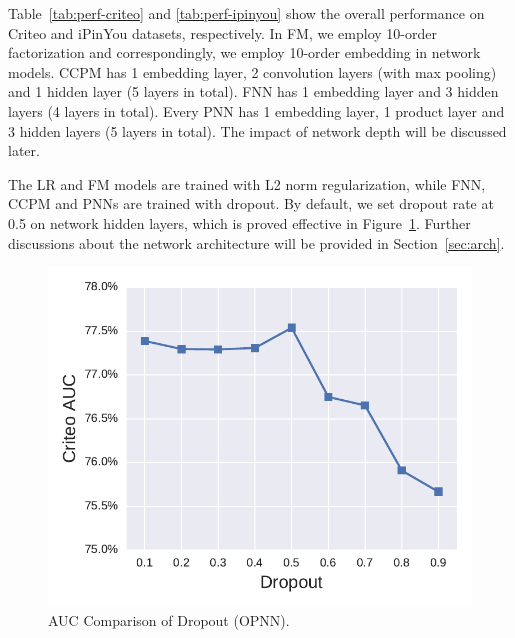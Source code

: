 \documentclass[conference]{IEEEtran}
\newcommand{\kan}[1]{{\bf \color{green} [[Kan says ``#1'']]}}
\begin{document}
Table~\ref{tab:perf-criteo} and \ref{tab:perf-ipinyou} show the overall performance on Criteo and iPinYou datasets, respectively.
In FM, we employ 10-order factorization and correspondingly, we employ 10-order embedding in network models. CCPM has 1 embedding layer, 2 convolution layers (with max pooling) and 1 hidden layer (5 layers in total). FNN has 1 embedding layer and 3 hidden layers (4 layers in total).
Every PNN has 1 embedding layer, 1 product layer and 3 hidden layers (5 layers in total). The impact of network depth will be discussed later.

The LR and FM models are trained with L2 norm regularization, while FNN, CCPM and PNNs are trained with dropout.
By default, we set dropout rate at 0.5 on network hidden layers, which is proved effective in Figure~\ref{fig:drop-auc}.
Further discussions about the network architecture will be provided in Section~\ref{sec:arch}.

\begin{figure}[t]
	\centering
	\includegraphics[width=0.7\columnwidth]{figure/drop-auc-2.pdf}
\vspace{-5pt}	
\caption{AUC Comparison of Dropout (OPNN).}\label{fig:drop-auc}
\vspace{-5pt}	
\end{figure}
\end{document}
